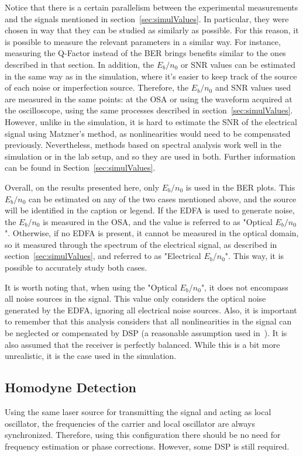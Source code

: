 	Notice that there is a certain parallelism between the experimental
	measurements and the signals mentioned in section~\ref{sec:simulValues}. In
	particular, they were chosen in way that they can be studied as similarly as
	possible. For this reason, it is possible to measure the relevant parameters
	in a similar way. For instance, measuring the Q-Factor instead of the BER
	brings benefits similar to the ones described in that section. In
	addition, the $E_b/n_0$ or SNR values can be estimated in the same way as in
	the simulation, where it's easier to keep track of the source of each noise or
	imperfection source. Therefore, the $E_b/n_0$ and SNR values used are measured
	in the same points: at the OSA or using the waveform acquired at the
	oscilloscope, using the same processes described in
	section~\ref{sec:simulValues}. However, unlike in the simulation, it is hard
	to estimate the SNR of the electrical signal using Matzner's method, as
	nonlinearities would need to be compensated previously. Nevertheless, methods
	based on spectral analysis work well in the simulation or in the lab setup,
	and so they are used in both. Further information can be found in
	Section~\ref{sec:simulValues}.

	Overall, on the results presented here, only $E_b/n_0$ is used in the BER
	plots. This $E_b/n_0$ can be estimated on any of the two cases mentioned
	above, and the source will be identified in the caption or legend. If the EDFA
	is used to generate noise, the $E_b/n_0$ is measured in the OSA, and the value
	is referred to as "Optical $E_b/n_0$". Otherwise, if no EDFA is present,
	it cannot be measured in the optical domain, so it measured through the
	spectrum of the electrical signal, as described in
	section~\ref{sec:simulValues}, and referred to as "Electrical $E_b/n_0$".
	This way, it is possible to accurately study both cases.

	It is worth noting that, when using the "Optical $E_b/n_0$", it does not
	encompass all noise sources in the signal. This value only considers the optical noise
	generated by the EDFA, ignoring all electrical noise sources. Also, it is
	important to remember that this analysis considers that all nonlinearities in
	the signal can be neglected or compensated by DSP (a reasonable assumption
	used in~\cite{crognale14}). It is also assumed that the receiver is perfectly
	balanced. While this is a bit more unrealistic, it is the case used in the simulation.

	\subsection{Homodyne Detection}
	Using the same laser source for transmitting the signal and acting as local
	oscillator, the frequencies of the carrier and local oscillator are always
	synchronized. Therefore, using this configuration there should be no need for
	frequency estimation or phase corrections. However, some DSP is still
	required.

